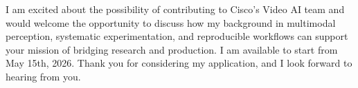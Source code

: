 \documentclass[11pt, a4paper]{awesome-cv}
\begin{document}
\begin{cvletter}




%
%



I am excited about the possibility of contributing to Cisco's Video AI team and would welcome the opportunity to discuss how my background in multimodal perception, systematic experimentation, and reproducible workflows can support your mission of bridging research and production. I am available to start from May 15th, 2026. Thank you for considering my application, and I look forward to hearing from you.

\end{cvletter}


\makeletterclosing
\end{document}
